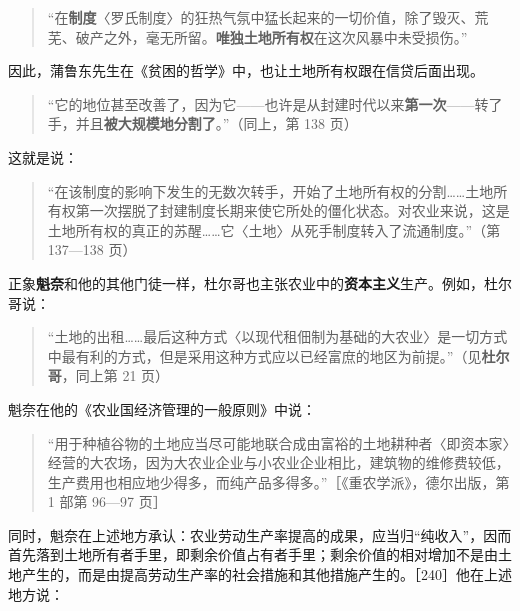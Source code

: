 \begin{quote}“在\textbf{制度}〈罗氏制度〉的狂热气氛中猛长起来的一切价值，除了毁灭、荒芜、破产之外，毫无所留。\textbf{唯独土地所有权}在这次风暴中未受损伤。”\end{quote}

\fontbox{~\{}因此，蒲鲁东先生在《贫困的哲学》中，也让土地所有权跟在信贷后面出现。\fontbox{\}~}

\begin{quote}“它的地位甚至改善了，因为它——也许是从封建时代以来\textbf{第一次}——转了手，并且\textbf{被大规模地分割了}。”（同上，第 138 页）\end{quote}

这就是说：

\begin{quote}“在该制度的影响下发生的无数次转手，开始了土地所有权的分割……土地所有权第一次摆脱了封建制度长期来使它所处的僵化状态。对农业来说，这是土地所有权的真正的苏醒……它〈土地〉从死手制度转入了流通制度。”（第 137—138 页）\end{quote}

正象\textbf{魁奈}和他的其他门徒一样，杜尔哥也主张农业中的\textbf{资本主义}生产。例如，杜尔哥说：

\begin{quote}“土地的出租……最后这种方式〈以现代租佃制为基础的大农业〉是一切方式中最有利的方式，但是采用这种方式应以已经富庶的地区为前提。”（见\textbf{杜尔哥}，同上第 21 页）\end{quote}

魁奈在他的《农业国经济管理的一般原则》中说：

\begin{quote}“用于种植谷物的土地应当尽可能地联合成由富裕的土地耕种者〈即资本家〉经营的大农场，因为大农业企业与小农业企业相比，建筑物的维修费较低，生产费用也相应地少得多，而纯产品多得多。”［《重农学派》，德尔出版，第 1 部第 96—97 页］\end{quote}

同时，魁奈在上述地方承认：农业劳动生产率提高的成果，应当归“纯收入”，因而首先落到土地所有者手里，即剩余价值占有者手里；剩余价值的相对增加不是由土地产生的，而是由提高劳动生产率的社会措施和其他措施产生的。［240］他在上述地方说：

